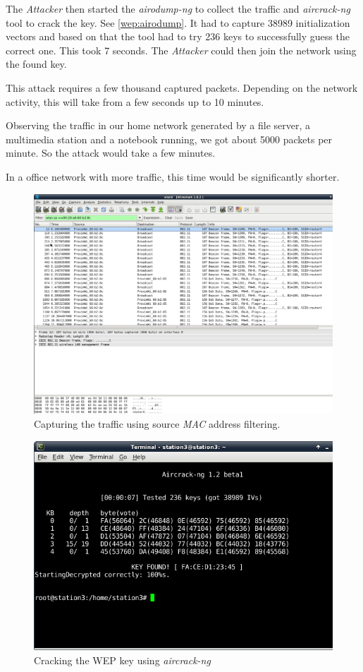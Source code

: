 \documentclass[12pt,a4paper]{article}
\begin{document}
		The \emph{Attacker} then started the \emph{airodump-ng} to collect the traffic and \emph{aircrack-ng} tool to crack the key. See \autoref{wep:airodump}.
		It had to capture 38989 initialization vectors and based on that the tool had to try 236 keys to successfully guess the correct one. This took 7 seconds.
		The \emph{Attacker} could then join the network using the found key.
		
		This attack requires a few thousand captured packets. Depending on the network activity, this will take from a few seconds up to 10 minutes.
		
		Observing the traffic in our home network generated by a file server, a multimedia station and a notebook running, we got about 5000 packets per minute. So the attack would take a few minutes.
		
		In a office network with more traffic, this time would be significantly shorter.
		
		
		\begin{figure}
			\includegraphics[width=\textwidth]{images/bill/pic1.png}
			\caption{Capturing the traffic using source \emph{MAC} address filtering.}
			\label{wep:wireshark}
		\end{figure}
		\begin{figure}
			\includegraphics[width=\textwidth]{images/bill/pic3.png}
			\caption{Cracking the WEP key using \emph{aircrack-ng}}
			\label{wep:airodump}
		\end{figure}
		
\end{document}
